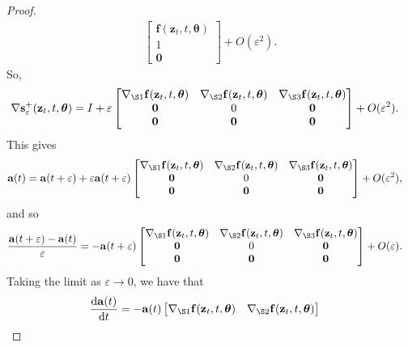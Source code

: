 \documentclass[10pt]{article}
\newcommand{\dee}{\mathrm{d}}
\newcommand{\ve}[1]{\mathbf{#1}}
\newcommand{\ves}[1]{\boldsymbol{#1}}
\begin{document}
\begin{itemize}
\begin{proof}
\begin{align*}
\begin{bmatrix}
        \ve{f}(\ve{z}_t, t, \ves{\theta}) \\
        1 \\
        \ve{0}
      \end{bmatrix} 
      + O(\varepsilon^2).      
    \end{align*}
    So,
    \begin{align*}
      \nabla \ve{s}^+_\varepsilon(\ve{z}_t, t, \ves{\theta})
      &= I + \varepsilon \begin{bmatrix}
        \nabla_{\S1}\ve{f}(\ve{z}_t, t, \ves{\theta})
        & \nabla_{\S2}\ve{f}(\ve{z}_t, t, \ves{\theta})
        & \nabla_{\S3}\ve{f}(\ve{z}_t, t, \ves{\theta}) \\
        \ve{0} & 0 & \ve{0} \\
        \ve{0} & \ve{0} & \ve{0}
      \end{bmatrix} + O(\varepsilon^2).
    \end{align*}
    This gives
    \begin{align*}
      \ve{a}(t) 
      &= \ve{a}(t + \varepsilon) 
      + \varepsilon \ve{a}(t + \varepsilon) \begin{bmatrix}
        \nabla_{\S1}\ve{f}(\ve{z}_t, t, \ves{\theta})
        & \nabla_{\S2}\ve{f}(\ve{z}_t, t, \ves{\theta})
        & \nabla_{\S3}\ve{f}(\ve{z}_t, t, \ves{\theta}) \\
        \ve{0} & 0 & \ve{0} \\
        \ve{0} & \ve{0} & \ve{0}
      \end{bmatrix} + O(\varepsilon^2),
    \end{align*}
    and so
    \begin{align*}
      \frac{\ve{a}(t+\varepsilon) - \ve{a}(t)}{\varepsilon} 
      &= -\ve{a}(t + \varepsilon) \begin{bmatrix}
        \nabla_{\S1}\ve{f}(\ve{z}_t, t, \ves{\theta})
        & \nabla_{\S2}\ve{f}(\ve{z}_t, t, \ves{\theta})
        & \nabla_{\S3}\ve{f}(\ve{z}_t, t, \ves{\theta}) \\
        \ve{0} & 0 & \ve{0} \\
        \ve{0} & \ve{0} & \ve{0}
      \end{bmatrix} + O(\varepsilon).
    \end{align*}
    Taking the limit as $\varepsilon \rightarrow 0$, we have that
    \begin{align*}
      \frac{\dee \ve{a}(t)}{\dee t}
      &= -\ve{a}(t) \begin{bmatrix}
        \nabla_{\S1}\ve{f}(\ve{z}_t, t, \ves{\theta})
        & \nabla_{\S2}\ve{f}(\ve{z}_t, t, \ves{\theta})

\end{bmatrix}
\end{align*}
\end{proof}
\end{itemize}
\end{document}
